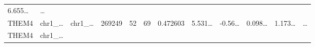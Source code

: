\documentclass[
]{article}
\begin{document}
\begin{longtable}[]{@{}llllllllllll@{}}
\begin{minipage}[t]{0.09\columnwidth}
6.655\ldots{}\strut
\end{minipage} & \begin{minipage}[t]{0.02\columnwidth}\raggedright
\ldots{}\strut
\end{minipage}\tabularnewline
\begin{minipage}[t]{0.06\columnwidth}\raggedright
THEM4\strut
\end{minipage} & \begin{minipage}[t]{0.06\columnwidth}\raggedright
chr1\_\ldots{}\strut
\end{minipage} & \begin{minipage}[t]{0.06\columnwidth}\raggedright
chr1\_\ldots{}\strut
\end{minipage} & \begin{minipage}[t]{0.06\columnwidth}\raggedright
269249\strut
\end{minipage} & \begin{minipage}[t]{0.06\columnwidth}\raggedright
52\strut
\end{minipage} & \begin{minipage}[t]{0.06\columnwidth}\raggedright
69\strut
\end{minipage} & \begin{minipage}[t]{0.06\columnwidth}\raggedright
0.472603\strut
\end{minipage} & \begin{minipage}[t]{0.08\columnwidth}\raggedright
5.531\ldots{}\strut
\end{minipage} & \begin{minipage}[t]{0.06\columnwidth}\raggedright
-0.56\ldots{}\strut
\end{minipage} & \begin{minipage}[t]{0.06\columnwidth}\raggedright
0.098\ldots{}\strut
\end{minipage} & \begin{minipage}[t]{0.09\columnwidth}\raggedright
1.173\ldots{}\strut
\end{minipage} & \begin{minipage}[t]{0.02\columnwidth}\raggedright
\ldots{}\strut
\end{minipage}\tabularnewline
\begin{minipage}[t]{0.06\columnwidth}\raggedright
THEM4\strut
\end{minipage} & \begin{minipage}[t]{0.06\columnwidth}\raggedright
chr1\_\ldots{}\strut
\end{minipage} & \begin{minipage}[t]{0.06\columnwidth}\raggedright

\end{minipage}
\end{longtable}
\end{document}
